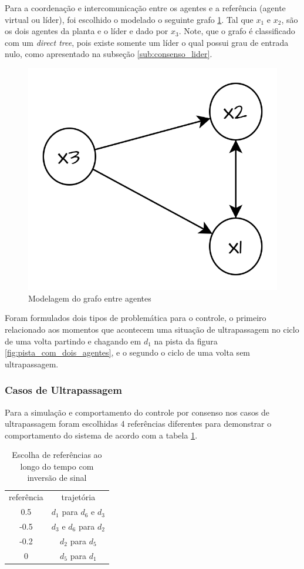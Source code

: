 Para a coordenação e intercomunicação entre os agentes e a referência (agente virtual ou líder), foi escolhido o modelado o seguinte grafo \ref{fig:grafo_cooperativo}. Tal que $x_1$ e $x_2$, são os dois agentes da planta e o líder e dado por $x_3$. Note, que o grafo é classificado com um \textit{direct tree}, pois existe somente um líder o qual possui grau de entrada nulo, como apresentado na subseção \ref{sub:consenso_lider}. 

\begin{figure}[ht]
    \centering
    \caption{Modelagem do grafo entre agentes}
    \label{fig:grafo_cooperativo}
    \includegraphics[width=0.4\linewidth]{figures/Simulation/Cooperativo/grafo_cooperativo.png}
\end{figure}

Foram formulados dois tipos de problemática para o controle, o primeiro relacionado aos momentos que acontecem uma situação de ultrapassagem no ciclo de uma volta partindo e chagando em $d_1$ na pista da figura \ref{fig:pista_com_dois_agentes}, e o segundo o ciclo de uma volta sem ultrapassagem.

\subsubsection{Casos de Ultrapassagem}
Para a simulação e comportamento do controle por consenso nos casos de ultrapassagem foram escolhidas 4 referências diferentes para demonstrar o comportamento do sistema de acordo com a tabela \ref{tab:caso1_utrapassagem}. 
\begin{table}[ht]
    \centering
    \begin{tabular}{c|c}                 
         referência & trajetória  \\ \cline{1-2}
          0.5 & $d_1$ para $d_6$ e $d_3$  \\ \cline{1-2}
         -0.5 & $d_3$ e $d_6$ para $d_2$ \\ \cline{1-2}
         -0.2 & $d_2$ para $d_5$  \\ \cline{1-2}
            0 & $d_5$ para $d_1$ \\     
    \end{tabular}
    \caption{Escolha de referências ao longo do tempo com inversão de sinal}
    \label{tab:caso1_utrapassagem}
\end{table}

